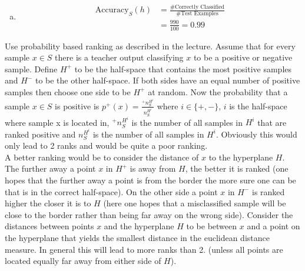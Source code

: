 \documentclass[10pt,a4paper,boxed]{hmcpset}
\begin{document}
				\begin{solution}		
					\begin{enumerate}[(a)]
						\item 
							\begin{align*}
								\textrm{Accuracy}_S(h) & = \frac{\textrm{\# Correctly Classified}}{\textrm{\#Test Examples}}\\
												       & = \frac{990}{100} = 0.99
							\end{align*}
					\end{enumerate}
				\end{solution}		
\begin{problem}[5. AUC]
\end{problem}
\begin{solution}
Use probability based ranking as described in the lecture. Assume that for every
sample $x\in S$ there is a teacher output classifying $x$ to be a positive or
negative sample. Define $H^+$ to be the half-space that contains the most
positive samples and $H^-$ to be the other half-space. If both sides have an
equal number of positive samples then choose one side to be $H^+$ at random. Now
the probability that a sample $x\in S$ is positive is $p^+(x)=\frac{^+
n_S^{H^i}}{n_S^{H^i}}$ where $i\in\{+,-\}$, $i$ is the half-space where sample x
is located in, $^+ n_S^{H^i}$ is the number of all samples in $H^i$ that are
ranked positive and $n_S^{H^i}$ is the number of all samples in $H^i$. Obviously
this would only lead to 2 ranks and would be quite a poor ranking.\\
A better ranking would be to consider the distance of $x$ to the hyperplane $H$.
The further away a point $x$ in $H^+$ is away from $H$, the better it is ranked
(one hopes that the further away a point is from the border the more sure one
can be that is in the correct half-space). On the other side a point $x$ in
$H^-$ is ranked higher the closer it is to $H$ (here one hopes that a
misclassified sample will be close to the border rather than being far away on
the wrong side). Consider the distances between points $x$ and the hyperplane
$H$ to be between $x$ and a point on the hyperplane that yields the smallest
distance in the euclidean distance measure. In general this will lead to more
ranks than 2. (unless all points are located equally far away from either side
of $H$).
\end{solution}
	
	
\end{document}
